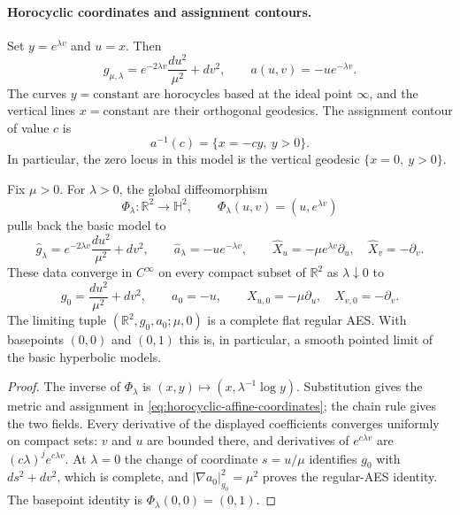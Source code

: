 \paragraph{Horocyclic coordinates and assignment contours.}
Set $y=e^{\lambda v}$ and $u=x$.  Then
\begin{equation}\label{eq:horocyclic-affine-coordinates}
 g_{\mu,\lambda}
 =e^{-2\lambda v}\frac{du^2}{\mu^2}+dv^2,
 \qquad
 a(u,v)=-u e^{-\lambda v}.
\end{equation}
The curves $y=\mathrm{constant}$ are horocycles based at the ideal point
$\infty$, and the vertical lines $x=\mathrm{constant}$ are their
orthogonal geodesics.  The assignment contour of value $c$ is
\[
 a^{-1}(c)=\{x=-cy,\ y>0\}.
\]
In particular, the zero locus in this model is the vertical geodesic
$\{x=0,\ y>0\}$.

\begin{proposition}\label{prop:p0-flat-limit}
Fix $\mu>0$.  For $\lambda>0$, the global diffeomorphism
\[
 \Phi_\lambda:\mathbb R^2\longrightarrow\mathbb H^2,
 \qquad \Phi_\lambda(u,v)=(u,e^{\lambda v})
\]
pulls back the basic model to
\[
 \widehat g_\lambda=e^{-2\lambda v}\frac{du^2}{\mu^2}+dv^2,
 \qquad \widehat a_\lambda=-u e^{-\lambda v},
 \qquad
 \widehat X_u=-\mu e^{\lambda v}\partial_u,\quad
 \widehat X_v=-\partial_v.
\]
These data converge in $C^\infty$ on every compact subset of $\mathbb R^2$
as $\lambda\downarrow0$ to
\[
 g_0=\frac{du^2}{\mu^2}+dv^2,\qquad a_0=-u,\qquad
 X_{u,0}=-\mu\partial_u,\quad X_{v,0}=-\partial_v.
\]
The limiting tuple $(\mathbb R^2,g_0,a_0;\mu,0)$ is a complete flat regular
AES.  With basepoints $(0,0)$ and $(0,1)$ this is, in particular, a smooth
pointed limit of the basic hyperbolic models.
\end{proposition}

\begin{proof}
The inverse of $\Phi_\lambda$ is $(x,y)\mapsto(x,\lambda^{-1}\log y)$.
Substitution gives the metric and assignment in
\eqref{eq:horocyclic-affine-coordinates}; the chain rule gives the two fields.
Every derivative of the displayed coefficients converges uniformly on compact
sets: $v$ and $u$ are bounded there, and derivatives of $e^{c\lambda v}$
are $(c\lambda)^j e^{c\lambda v}$.  At $\lambda=0$ the change of coordinate
$s=u/\mu$ identifies $g_0$ with $ds^2+dv^2$, which is complete, and
$|\nabla a_0|_{g_0}^2=\mu^2$ proves the regular-AES identity.
The basepoint identity is $\Phi_\lambda(0,0)=(0,1)$.
\end{proof}

